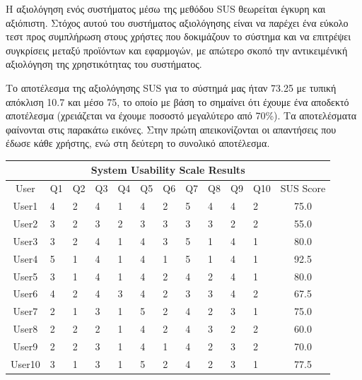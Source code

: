 Η αξιολόγηση ενός συστήματος μέσω της μεθόδου SUS θεωρείται έγκυρη και αξιόπιστη. Στόχος αυτού του συστήματος αξιολόγησης είναι να παρέχει ένα εύκολο τεστ προς συμπλήρωση στους χρήστες που δοκιμάζουν το σύστημα και να επιτρέψει συγκρίσεις μεταξύ προϊόντων και εφαρμογών, με απώτερο σκοπό την αντικειμένική αξιολόγηση της χρηστικότητας του συστήματος. 


Το αποτέλεσμα της αξιολόγησης SUS για το σύστημά μας ήταν 73.25 με τυπική απόκλιση 10.7 και μέσο 75, το οποίο με βάση το \cite{bangor2008empirical} σημαίνει ότι έχουμε ένα αποδεκτό αποτέλεσμα (χρειάζεται να έχουμε ποσοστό μεγαλύτερο από 70\%).
Τα αποτελέσματα φαίνονται στις παρακάτω εικόνες. Στην πρώτη απεικονίζονται οι απαντήσεις που έδωσε κάθε χρήστης, ενώ στη δεύτερη το συνολικό αποτέλεσμα.

\begin{center}
\begin{tabular}{ |c||p{0.6cm}|p{0.6cm}|p{0.6cm}|p{0.6cm}|p{0.6cm}|p{0.6cm}|p{0.6cm}|p{0.6cm}|p{0.6cm}|p{0.8cm}||c|  }
\hline
 \multicolumn{12}{|c|}{System Usability Scale Results} \\
\hline
User   & Q1 & Q2 & Q3 & Q4 & Q5 & Q6 & Q7 & Q8 & Q9 & Q10 & SUS Score\\
 \hline
 User1   & 4    & 2 &   4 &   1 &   4 &   2 &   5 &   4 &   4 &   2 &   75.0\\
 User2   & 3    & 2 &   3 &   2 &   3 &   3 &   3 &   3 &   2 &   2 &   55.0\\
 User3   & 3    & 2 &   4 &   1 &   4 &   3 &   5 &   1 &   4 &   1 &   80.0\\
 User4   & 5    & 1 &   4 &   1 &   4 &   1 &   5 &   1 &   4 &   1 &   92.5\\
 User5   & 3    & 1 &   4 &   1 &   4 &   2 &   4 &   2 &   4 &   1 &   80.0\\
 User6   & 4    & 2 &   4 &   3 &   4 &   2 &   3 &   3 &   4 &   2 &   67.5\\
 User7   & 2    & 1 &   3 &   1 &   5 &   2 &   4 &   2 &   3 &   1 &   75.0\\
 User8   & 2    & 2 &   2 &   1 &   4 &   2 &   4 &   3 &   2 &   2 &   60.0\\
 User9   & 2    & 2 &   3 &   1 &   4 &   1 &   4 &   2 &   3 &   2 &   70.0\\
 User10   & 3    & 1 &   3 &   1 &   5 &   2 &   4 &   2 &   3 &   1 &   77.5\\
\hline
\end{tabular}
\end{center}


